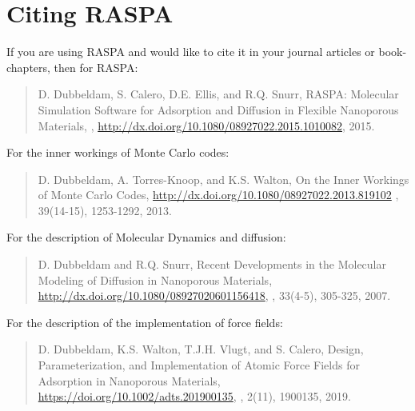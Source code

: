 \section{Citing RASPA}

If you are using RASPA and would like to cite it in your journal articles or book-chapters, then for RASPA:

\begin{quote}
D. Dubbeldam, S. Calero, D.E. Ellis, and R.Q. Snurr,
\newblock RASPA: Molecular Simulation Software for Adsorption and Diffusion in Flexible Nanoporous Materials,
, \url{http://dx.doi.org/10.1080/08927022.2015.1010082}, 2015.
\end{quote}
For the inner workings of Monte Carlo codes:
\begin{quote}
D. Dubbeldam, A. Torres-Knoop, and K.S. Walton,
\newblock On the Inner Workings of Monte Carlo Codes,
\newblock  \url{http://dx.doi.org/10.1080/08927022.2013.819102}
, 39(14-15), 1253-1292, 2013.
\end{quote}
For the description of Molecular Dynamics and diffusion:
\begin{quote}
D. Dubbeldam and R.Q. Snurr,
\newblock Recent Developments in the Molecular Modeling of Diffusion in Nanoporous Materials,
\newblock  \url{http://dx.doi.org/10.1080/08927020601156418},
, 33(4-5), 305-325, 2007.
\end{quote}
For the description of the implementation of force fields:
\begin{quote}
D. Dubbeldam, K.S. Walton, T.J.H. Vlugt, and S. Calero,
\newblock Design, Parameterization, and Implementation of Atomic Force Fields for Adsorption in Nanoporous Materials,
\newblock  \url{https://doi.org/10.1002/adts.201900135},
, 2(11), 1900135, 2019.
\end{quote}

